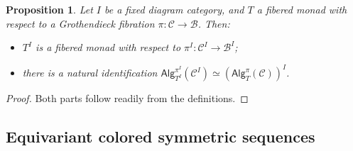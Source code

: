 \documentclass[a4paper,10pt
,draft
]{article}%
\numberwithin{equation}{section}
\numberwithin{figure}{section}
\newtheorem{proposition}[equation]{Proposition}%
\theoremstyle{definition} %
\newcommand{\1}{\ensuremath{\mathbbm 1}}%
\begin{document}
\begin{proposition}\label{DIAGRAMFM_PROP}
Let $I$ be a fixed diagram category, and $T$ a fibered monad with respect to a Grothendieck fibration 
$\pi \colon \mathcal{C} \to \mathcal{B}$. Then:
\begin{itemize}
\item[(i)] $T^I$ is a fibered monad with respect to $\pi^I\colon \mathcal{C}^I \to \mathcal{B}^I$;
\item[(ii)] there is a natural identification 
$\mathsf{Alg}_{T^I}^{\pi^I}(\mathcal{C}^I)
\simeq
\left(\mathsf{Alg}_T^{\pi}(\mathcal{C})\right)^I$.
\end{itemize}
\end{proposition}

\begin{proof}
Both parts follow readily from the definitions.
\end{proof}






\subsection{Equivariant colored symmetric sequences}
\label{EQCOSYMSEQ SEC}
\end{document}

